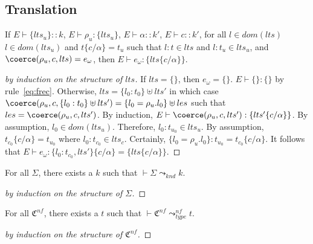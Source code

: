\subsection{Translation} 

\begin{lemma}\label{lem:coercion}
If $E\vdash \{lts_u\}::k$, $E\vdash
\rho_u : \{lts_u\}$, $E\vdash \alpha :: k'$, $E\vdash c :: k'$, 
for all $l\in dom(lts)$ $l \in dom(lts_u)$ and 
$t\{c/\alpha\}=t_u$ such that $l:t \in lts$ and $l:t_u \in lts_u$, and
 $\coerce(\rho_u,c,lts) = e_\omega$, then $E\vdash e_\omega : \{lts\{c/\alpha\}\}$. 
\end{lemma}
\begin{proof}[by induction on the structure of $lts$]
If $lts=\{\}$, then $e_\omega=\{\}$. $E\vdash \{\} : \{\}$ by
rule~\ref{eq:frec}. Otherwise, $lts=\{l_0:t_0\}\uplus lts'$ in which
case $\coerce(\rho_u,c,\{l_0:t_0\}\uplus lts') = \{l_0 =
\rho_u.l_0\}\uplus les$ such that $les = \coerce(\rho_u, c, lts')$. By
induction, $E\vdash \coerce(\rho_u, c, lts') : \{lts'\{c/\alpha\}\}$. By
assumption, $l_0\in dom(lts_u)$. Therefore, $l_0:t_{u_0}\in
lts_u$. By assumption, $t_{c_0}\{c/\alpha\}=t_{u_0}$ where
$l_0:t_{c_0}\in lts_c$. Certainly, $\{l_0 = \rho_u.l_0\} : t_{u_0} =
t_{c_0}\{c/\alpha\}$. It follows that $E \vdash e_\omega : \{l_0 :
t_{c_0}, lts'\}\{c/\alpha\} = \{lts\{c/\alpha\}\}$.  
\end{proof}

\begin{lemma}\label{lem:kndprogresses}
For all $\Sigma$, there exists a $k$ such that $\vdash
\Sigma\leadsto_{knd} k$. 
\end{lemma}
\begin{proof}[by induction on the structure of $\Sigma$]
\end{proof}

\begin{lemma}\label{lem:f-nf-type}
For all $\mathfrak{C}^{nf}$, there exists a $t$ such that $\vdash
\mathfrak{C}^{nf}\leadsto^{nf}_{type} t$. 
\end{lemma}
\begin{proof}[by induction on the structure of $\mathfrak{C}^{nf}$]
\end{proof}


